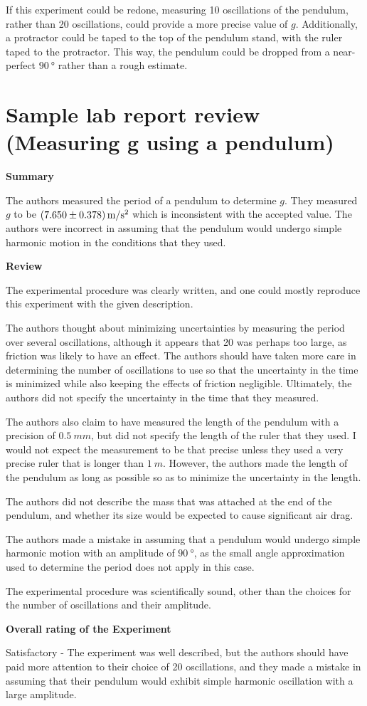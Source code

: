 If this experiment could be redone, measuring 10 oscillations of the pendulum, rather than 20 oscillations, could provide a more precise value of $g$. Additionally, a protractor could be taped to the top of the pendulum stand, with the ruler taped to the protractor. This way, the pendulum could be dropped from a near-perfect $\SI{90}{\degree}$ rather than a rough estimate. 

\newpage
\section{Sample lab report review (Measuring g using a pendulum)}
 \vspace{0.25cm}
\textbf{Summary}

The authors measured the period of a pendulum to determine $g$. They measured $g$ to be $\SI{7.65\pm0.378}{m/s^2}$ which is inconsistent with the accepted value. The authors were incorrect in assuming that the pendulum would undergo simple harmonic motion in the conditions that they used.

\textbf{Review}

The experimental procedure was clearly written, and one could mostly reproduce this experiment with the given description.

The authors thought about minimizing uncertainties by measuring the period over several oscillations, although it appears that 20 was perhaps too large, as friction was likely to have an effect. The authors should have taken more care in determining the number of oscillations to use so that the uncertainty in the time is minimized while also keeping the effects of friction negligible. Ultimately, the authors did not specify the uncertainty in the time that they measured.

The authors also claim to have measured the length of the pendulum with a precision of $\SI{0.5}{mm}$, but did not specify the length of the ruler that they used. I would not expect the measurement to be that precise unless they used a very precise ruler that is longer than $\SI{1}{m}$. However, the authors made the length of the pendulum as long as possible so as to minimize the uncertainty in the length.

The authors did not describe the mass that was attached at the end of the pendulum, and whether its size would be expected to cause significant air drag.

The authors made a mistake in assuming that a pendulum would undergo simple harmonic motion with an amplitude of $\SI{90}{\degree}$, as the small angle approximation used to determine the period does not apply in this case.

The experimental procedure was scientifically sound, other than the choices for the number of oscillations and their amplitude.

\textbf{Overall rating of the Experiment}

Satisfactory - The experiment was well described, but the authors should have paid more attention to their choice of 20 oscillations, and they made a mistake in assuming that their pendulum would exhibit simple harmonic oscillation with a large amplitude.

